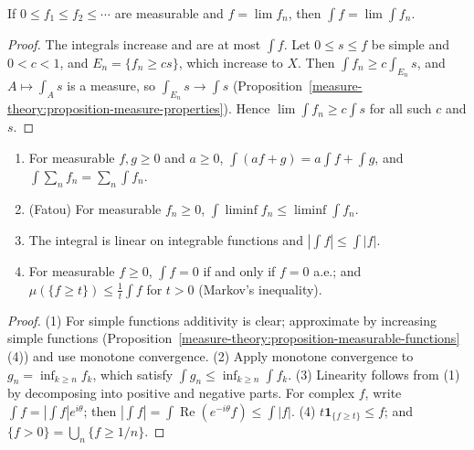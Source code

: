 \begin{theorem}\label{measure-theory:theorem-monotone-convergence}
If $0 \leq f_1 \leq f_2 \leq \cdots$ are measurable and $f = \lim f_n$, then $\int f = \lim\int f_n$.
\end{theorem}

\begin{proof}
The integrals increase and are at most $\int f$. Let $0 \leq s \leq f$ be simple and $0 < c < 1$, and $E_n = \{f_n \geq cs\}$, which increase to $X$. Then $\int f_n \geq c\int_{E_n}s$, and
$A \mapsto \int_As$ is a measure, so $\int_{E_n}s \to \int s$ (Proposition~\ref{measure-theory:proposition-measure-properties}). Hence $\lim\int f_n \geq c\int s$ for all such $c$ and $s$.
\end{proof}

\begin{corollary}\label{measure-theory:corollary-integral-properties}
\begin{enumerate}
\item For measurable $f, g \geq 0$ and $a \geq 0$, $\int(af + g) = a\int f + \int g$, and $\int\sum_nf_n = \sum_n\int f_n$.
\item (Fatou) For measurable $f_n \geq 0$, $\int\liminf f_n \leq \liminf\int f_n$.
\item The integral is linear on integrable functions and $|\int f| \leq \int|f|$.
\item For measurable $f \geq 0$, $\int f = 0$ if and only if $f = 0$ a.e.; and $\mu(\{f \geq t\}) \leq \frac1t\int f$ for $t > 0$ (Markov's inequality).
\end{enumerate}
\end{corollary}

\begin{proof}
(1) For simple functions additivity is clear; approximate by increasing simple functions (Proposition~\ref{measure-theory:proposition-measurable-functions}(4)) and use monotone convergence. (2) Apply
monotone convergence to $g_n = \inf_{k \geq n}f_k$, which satisfy $\int g_n \leq \inf_{k \geq n}\int f_k$. (3) Linearity follows from (1) by decomposing into positive and negative parts. For complex $f$, write
$\int f = |\int f|e^{i\theta}$; then $|\int f| = \int\operatorname{Re}(e^{-i\theta}f) \leq \int|f|$. (4) $t\mathbf{1}_{\{f \geq t\}} \leq f$; and $\{f > 0\} = \bigcup_n\{f \geq 1/n\}$.
\end{proof}

